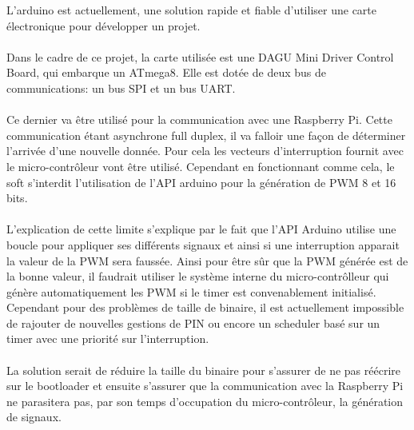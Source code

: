 

  L'arduino est actuellement, une solution rapide et fiable d'utiliser une carte
électronique pour développer un projet.
\paragraph{}
  Dans le cadre de ce projet, la carte utilisée est une DAGU Mini Driver Control
Board, qui embarque un ATmega8. Elle est dotée de deux bus de communications: un
bus SPI et un bus UART.
\paragraph{}
  Ce dernier va être utilisé pour la communication avec une Raspberry Pi. Cette
communication étant asynchrone full duplex, il va falloir une façon de
déterminer l'arrivée d'une nouvelle donnée. Pour cela les
vecteurs d'interruption fournit avec le micro-contrôleur vont être utilisé.
Cependant en fonctionnant comme cela, le soft s'interdit l'utilisation de l'API
arduino pour la génération de PWM 8 et 16 bits.
\paragraph{}
  L'explication de cette limite s'explique par le fait que l'API Arduino utilise
une boucle pour appliquer ses différents signaux et ainsi si une interruption
apparait la valeur de la PWM sera faussée. Ainsi pour être sûr que la PWM
générée est de la bonne valeur, il faudrait utiliser le système interne du
micro-contrôlleur qui génère automatiquement les PWM si le timer est
convenablement initialisé. Cependant pour des problèmes de taille de binaire,
il est actuellement impossible de rajouter de nouvelles gestions de PIN ou
encore un scheduler basé sur un timer avec une priorité sur l'interruption.
\paragraph{}
  La solution serait de réduire la taille du binaire pour s'assurer de ne pas
réécrire sur le bootloader et ensuite s'assurer que la communication avec la
Raspberry Pi ne parasitera pas, par son temps d'occupation du
micro-contrôleur, la génération de signaux.\\
